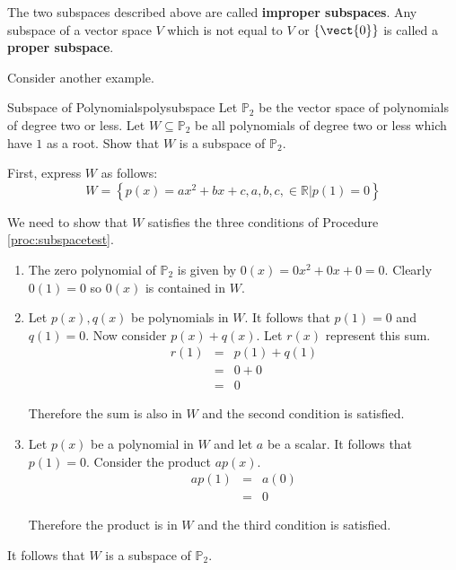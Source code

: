 The two subspaces described above are called \textbf{improper subspaces}. Any subspace of a vector space $V$ which is not equal to $V$ or  $\left\{ \vect{0} \right\}$ is called a \textbf{proper subspace}. 

Consider another example.

\begin{example}{Subspace of Polynomials}{polysubspace}
Let $\mathbb{P}_2$ be the vector space of polynomials of degree two or less. Let $W \subseteq \mathbb{P}_2$ be all polynomials of degree two or less which have $1$ as a root. Show that $W$ is a subspace of $\mathbb{P}_2$. 
\end{example}

\begin{solution}
First, express $W$ as follows:
\[
W = \left\{ p(x) = ax^2 +bx +c, a,b,c, \in \mathbb{R} | p(1)  = 0 \right\}
\]

We need to show that $W$ satisfies the three conditions of Procedure \ref{proc:subspacetest}. 
\begin{enumerate}
\item
The zero polynomial of $\mathbb{P}_2$ is given by $0(x) = 0x^2 + 0x + 0 = 0$. Clearly $0(1) = 0$ so $0(x)$ is contained in $W$. 

\item
Let $p(x), q(x)$ be polynomials in $W$.  It follows that $p(1) = 0 $ and $q(1) = 0$. Now consider $p(x) + q(x)$. Let $r(x)$ represent this sum.
\begin{eqnarray*}
r(1) &=& p(1) + q(1) \\
&=& 0 + 0 \\
&=& 0
\end{eqnarray*}

Therefore the sum is also in $W$ and the second condition is satisfied. 

\item
Let $p(x)$ be a polynomial in $W$ and let $a$ be a scalar. It follows that $p(1) = 0$. Consider the product $ap(x)$. 
\begin{eqnarray*}
ap(1) &=& a(0) \\
&=& 0
\end{eqnarray*}

Therefore the product is in $W$ and the third condition is satisfied.
\end{enumerate}

It follows that $W$ is a subspace of $\mathbb{P}_2$. 
\end{solution} 

